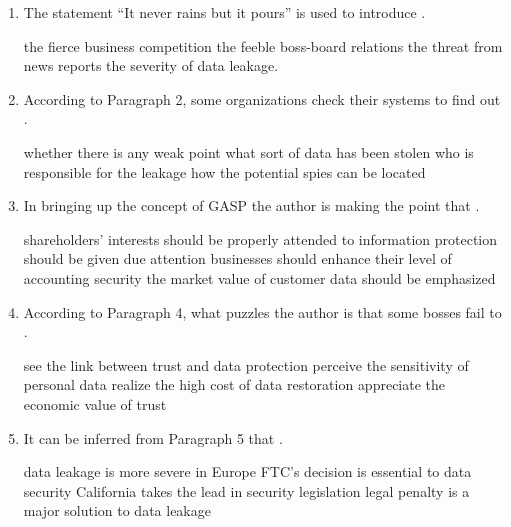 \begin{enumerate}[resume]
	\item
The statement ``It never rains but it pours'' is used to
introduce \lineread.


\fourchoices
{the fierce business competition}
{the feeble boss-board relations}
{the threat from news reports}
{the severity of data leakage.}



\item
 According to Paragraph 2, some organizations check their
systems to find out \lineread.


\fourchoices
{whether there is any weak point}
{what sort of data has been stolen}
{who is responsible for the leakage}
{how the potential spies can be located}



\item
In bringing up the concept of GASP the author is making the
point that \lineread.


\fourchoices
{shareholders' interests should be properly attended to}
{information protection should be given due attention}
{businesses should enhance their level of accounting security}
{the market value of customer data should be emphasized}



\item
 According to Paragraph 4, what puzzles the author is that
some bosses fail to \lineread.


\fourchoices
{see the link between trust and data protection}
{perceive the sensitivity of personal data}
{realize the high cost of data restoration}
{appreciate the economic value of trust}



\item
It can be inferred from Paragraph 5 that \lineread.


\fourchoices
{data leakage is more severe in Europe}
{FTC's decision is essential to data security}
{California takes the lead in security legislation}
{legal penalty is a major solution to data leakage}


\end{enumerate}



